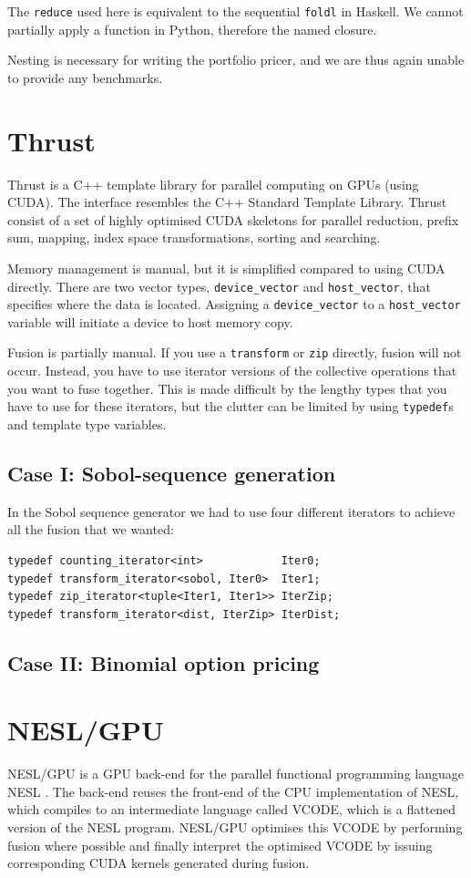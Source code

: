 \documentclass[preprint]{sigplanconf}
\begin{document}
The \verb|reduce| used here is equivalent to the sequential
\verb|foldl| in Haskell. We cannot partially apply a function in
Python, therefore the named closure.

Nesting is necessary for writing the portfolio pricer, and we are thus
again unable to provide any benchmarks.

\section{Thrust}
Thrust is a C++ template library for parallel computing on GPUs (using
CUDA). The interface resembles the C++ Standard Template
Library. Thrust consist of a set of highly optimised CUDA skeletons
for parallel reduction, prefix sum, mapping, index space
transformations, sorting and searching.

Memory management is manual, but it is simplified compared to using
CUDA directly. There are two vector types, \verb|device_vector| and
\verb|host_vector|, that specifies where the data is
located. Assigning a \verb|device_vector| to a \verb|host_vector|
variable will initiate a device to host memory copy.

Fusion is partially manual. If you use a \verb|transform| or
\verb|zip| directly, fusion will not occur. Instead, you have to use
iterator versions of the collective operations that you want to fuse
together. This is made difficult by the lengthy types that you have to
use for these iterators, but the clutter can be limited by using
\verb|typedef|s and template type variables.

\subsection{Case I: Sobol-sequence generation}
In the Sobol sequence generator we had to use four different iterators
to achieve all the fusion that we wanted:
\begin{verbatim}
typedef counting_iterator<int>            Iter0;
typedef transform_iterator<sobol, Iter0>  Iter1;
typedef zip_iterator<tuple<Iter1, Iter1>> IterZip;
typedef transform_iterator<dist, IterZip> IterDist;
\end{verbatim}

\subsection{Case II: Binomial option pricing}

\section{NESL/GPU}
NESL/GPU is a GPU back-end for the parallel functional programming
language NESL \cite{nesl}. The back-end reuses the front-end of the
CPU implementation of NESL, which compiles to an intermediate language
called VCODE, which is a flattened version of the NESL
program. NESL/GPU optimises this VCODE by performing fusion where
possible and finally interpret the optimised VCODE by issuing
corresponding CUDA kernels generated during fusion.
\end{document}
